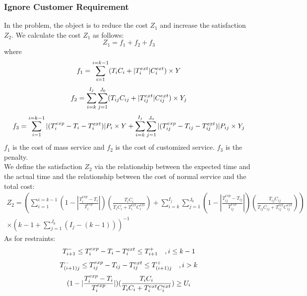 \documentclass[12pt,a4paper]{article}
\begin{document}
\subsubsection{Ignore Customer Requirement}
In the problem, the object is to reduce the cost $Z_1$ and increase the satisfaction $Z_2$.
We calculate the cost $Z_1$ as follows:
\begin{equation}
	Z_1=f_1+f_2+f_3
\end{equation}
where
\begin{equation}
	f_1 =\sum_{i=1}^{i=k-1}(T_iC_i+|T_i^{ext}|C_i^{ext})\times Y\\
\end{equation}
\begin{equation}
	f_2 =\sum_{i=k}^{I_j}\sum_{j=1}^{J_0}(T_{ij}C_{ij}+|T_{ij}^{ext}|C_{ij}^{ext})\times Y_j\\
\end{equation}
\begin{equation}
	f_3=\sum_{i=1}^{i=k-1}|(T_i^{exp}-T_i-T_i^{ext})|P_i\times Y+\sum_{i=k}^{I_j}\sum_{j=1}^{J_0}|(T_{ij}^{exp}-T_{ij}-T_{ij}^{ext})|P_{ij}\times Y_j\\
\end{equation}
$f_1$ is the cost of mass service and $f_2$ is the cost of customized service. $f_3$ is the penalty.\\
We define the satisfaction $Z_2$ via the relationship between the expected time and the actual time and the relationship between the cost of normal service and the total cost\cite{Liu}:
\begin{equation}
\begin{split}
	Z_2=(\sum_{i=1}^{i=k-1}(1-|\frac{T_i^{exp}-T_i}{T_i^{exp}}|)(\frac{T_iC_i}{T_iC_i+T_i^{ext}C_i^{ext}})+\sum_{i=k}^{I_j}\sum_{j=1}^{J_0}(1-|\frac{T_{ij}^{exp}-T_{ij}}{T_{ij}^{exp}}|)(\frac{T_{ij}C_{ij}}{T_{ij}C_{ij}+T_{ij}^{ext}C_{ij}^{ext}}))\\
	\times(k-1+\sum_{j=1}^{J_0}(I_j-(k-1)))^{-1}
\end{split}
\end{equation} 
As for restraints:
\begin{equation}
	T_{i+1}^-\leq T_i^{exp}-T_i-T_i^{ext}\leq T_{i+1}^+ \quad ,i\leq k-1\\
\end{equation}
\begin{equation}
	T_{(i+1)j}^-\leq T_{ij}^{exp}-T_{ij}-T_{ij}^{ext}\leq T_{(i+1)j}^+ \quad, i>k\\
\end{equation}
\begin{equation}
	(1-|\frac{T_i^{exp}-T_i}{T_i^{exp}}|)(\frac{T_iC_i}{T_iC_i+T_i^{ext}C_i^{ext}})\geq U_i\\
\end{equation}
\end{document}
